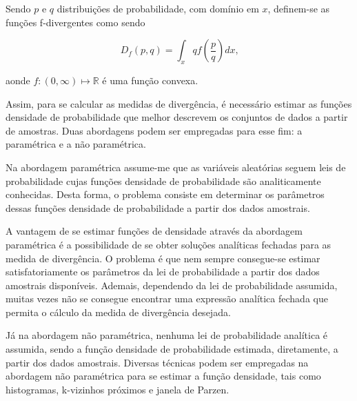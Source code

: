 Sendo $p$ e $q$ distribuições de probabilidade, com domínio em $x$, definem-se as funções f-divergentes como sendo

\begin{equation}
D_f(p,q) = \int_xqf(\frac{p}{q})dx\text{,}
\end{equation}

aonde $f:(0,\infty)\mapsto\mathbb{R}$ é uma função convexa.


Assim, para se calcular as medidas de divergência, é necessário estimar as funções densidade de probabilidade que melhor descrevem os conjuntos de dados a partir de amostras. Duas abordagens podem ser empregadas para esse fim: a paramétrica e a não paramétrica.

Na abordagem paramétrica assume-me que as variáveis aleatórias seguem leis de probabilidade cujas funções densidade de probabilidade são analiticamente conhecidas. Desta forma, o problema consiste em determinar os parâmetros dessas funções densidade de probabilidade a partir dos dados amostrais. 

A vantagem de se estimar funções de densidade através da abordagem paramétrica é a possibilidade de se obter soluções analíticas fechadas para as medida de divergência. O problema é que nem sempre consegue-se estimar satisfatoriamente os parâmetros da lei de probabilidade a partir dos dados amostrais disponíveis. Ademais, dependendo da lei de probabilidade assumida, muitas vezes não se consegue encontrar uma expressão analítica fechada que permita o cálculo da medida de divergência desejada.

Já na abordagem não paramétrica, nenhuma lei de probabilidade analítica é assumida, sendo a função densidade de probabilidade estimada, diretamente, a partir dos dados amostrais. Diversas técnicas podem ser empregadas na abordagem não paramétrica para se estimar a função densidade, tais como histogramas, k-vizinhos próximos e janela de Parzen.  

